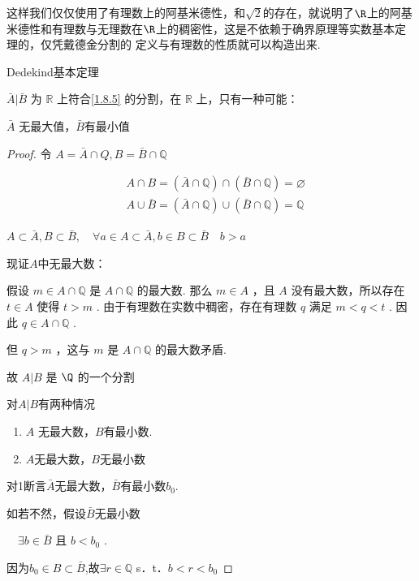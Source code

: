这样我们仅仅使用了有理数上的阿基米德性，和$\sqrt{2}$的存在，就说明了$\R$上的阿基米德性和有理数与无理数在$\R$上的稠密性，这是不依赖于确界原理等实数基本定理的，仅凭戴德金分割的 定义与有理数的性质就可以构造出来.
\begin{theorem}
	Dedekind基本定理
	
	
	$\bar{A}|\bar{B}$ 为 $\mathbb{R}$ 上符合\ref{1.8.5} 的分割，在 $\mathbb{R} $ 上，只有一种可能：
	
	$\bar{A}$ 无最大值，$\bar{B}$有最小值
	
\end{theorem}
\begin{proof}
	令 $A=\bar{A} \cap Q, B=\bar{B} \cap \mathbb{Q}$
	
	$$
	\begin{aligned}
		& A \cap B=(\bar{A} \cap \mathbb{Q}) \cap(\bar{B} \cap \mathbb{Q})=\varnothing\\
		& A \cup \bar{B}=(\bar{A} \cap \mathbb{Q}) \cup(\bar{B} \cap \mathbb{Q})=\mathbb{Q}
	\end{aligned}
	$$
	
	$A \subset \bar{A}, B \subset \bar{B} ,\quad \forall a \in A \subset \bar{A}, b \in B \subset \bar{B} \quad b>a$
	
	现证$A$中无最大数：
	
	假设 $m \in A \cap \mathbb{Q}$ 是 $A \cap \mathbb{Q}$ 的最大数.
	那么 $m \in A$ ，且 $A$ 没有最大数，所以存在 $t \in A$ 使得 $t>m$ .
	由于有理数在实数中稠密，存在有理数 $q$ 满足 $m<q<t$ .
	因此 $q \in A \cap \mathbb{Q}$ .
	
	但 $q>m$ ，这与 $m$ 是 $A \cap \mathbb{Q}$ 的最大数矛盾.
	
	故 $A|B$ 是 $\Q$ 的一个分割
	
	对$A|B$有两种情况
	\begin{enumerate}
		\item $A$ 无最大数，$B$有最小数.
		\item $A$无最大数，$B$无最小数
		
	\end{enumerate}
	
	
	
	
	
	对1断言$\bar{A}$无最大数，$\bar{B}$有最小数$b_0$.
	
	如若不然，假设$\bar{B}$无最小数
	
	$\quad \exists b \in \bar{B}$ 且 $b<b_0$ .
	
	因为$ b_0 \in  B \subset \bar{B}$,故$ \exists r \in \mathbb{Q}$ s．t．$b<r<b_0$
	

\end{proof}
